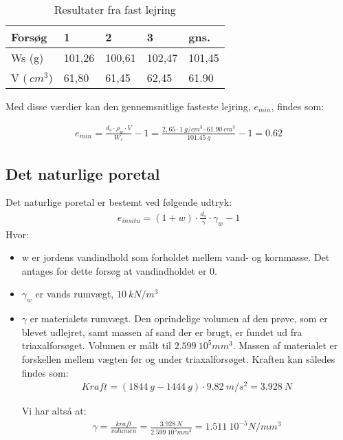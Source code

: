 \begin{table}[H]
\centering
\begin{tabular}{|l|l|l|l|l|}
\hline
Forsøg                   & 1      & 2      & 3      & gns.   \\ \hline
Ws (g)                   & 101,26 & 100,61 & 102,47 & 101,45 \\ \hline
V ($\SI{}{cm^{3}}$) & 61,80  & 61,45  & 62,45  & 61.90  \\ \hline
\end{tabular}
\caption{Resultater fra fast lejring}
\label{my-label}
\end{table}

Med disse værdier kan den gennemsnitlige fasteste lejring, $e_{min}$, findes som:


\begin{align*}
e_{min}=\frac{d_{s}\cdot \rho_{w}\cdot V}{W_{s}}-1=\frac{2,65\cdot \SI{1}{g/cm^{3}} \cdot \SI{61,90}{cm^{3}}}{\SI{101,45}{g}}-1=0.62
\end{align*}




\subsection{Det naturlige poretal}
Det naturlige poretal er bestemt ved følgende udtryk:
\begin{align*}
e_{in situ}=(1+w)\cdot\frac{d_{s}}{\gamma}\cdot \gamma_{w}-1
\end{align*}
Hvor:
\begin{itemize}
\item w er jordens vandindhold som forholdet mellem vand- og kornmasse. Det antages for dette forsøg at vandindholdet er 0.
\item $\gamma_{w}$ er vands rumvægt, $\SI{10}{kN/m^{3}}$ 
\item $\gamma$ er materialets rumvægt. Den oprindelige volumen af den prøve, som er blevet udlejret, samt massen af sand der er brugt, er fundet ud fra triaxalforsøget. Volumen er målt til $\SI{2,599}{10^{5}mm^{3}}$. Massen af materialet er forskellen mellem vægten før og under triaxalforsøget. Kraften kan således findes som:
\begin{align*}
Kraft=(\SI{1844}{g}-\SI{1444}{g})\cdot \SI{9,82}{m/s^{2}}=\SI{3,928}{N}
\end{align*}

Vi har altså at:
\begin{align*}
\gamma=\frac{kraft}{volumen}=\frac{\SI{3,928}{N}}{\SI{2,599}{10^{5}mm^{3}}}=\SI{1.511}{10^{-5}N/mm^{3}}
\end{align*}
\end{itemize}

